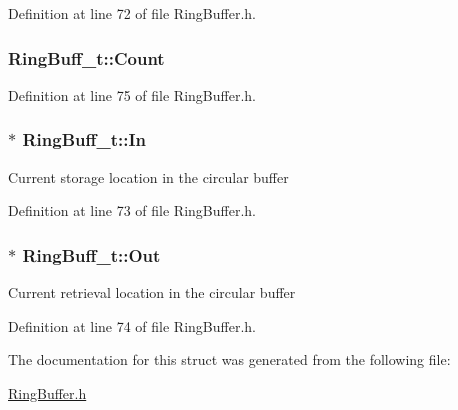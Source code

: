 \-Definition at line 72 of file \-Ring\-Buffer.\-h.

\hypertarget{struct_ring_buff__t_a41a9ebbce17afd63c9b1052b9374ab7f}{
\subsubsection[{\-Count}]{ {\bf \-Ring\-Buff\-\_\-t\-::\-Count}}}\label{struct_ring_buff__t_a41a9ebbce17afd63c9b1052b9374ab7f}


\-Definition at line 75 of file \-Ring\-Buffer.\-h.

\hypertarget{struct_ring_buff__t_ace48fed7a87967d5de48671dcd356ac6}{
\subsubsection[{\-In}]{$\ast$ {\bf \-Ring\-Buff\-\_\-t\-::\-In}}}\label{struct_ring_buff__t_ace48fed7a87967d5de48671dcd356ac6}
\-Current storage location in the circular buffer 

\-Definition at line 73 of file \-Ring\-Buffer.\-h.

\hypertarget{struct_ring_buff__t_adff6acf088e2c9697b9f19fb9ff91739}{
\subsubsection[{\-Out}]{$\ast$ {\bf \-Ring\-Buff\-\_\-t\-::\-Out}}}\label{struct_ring_buff__t_adff6acf088e2c9697b9f19fb9ff91739}
\-Current retrieval location in the circular buffer 

\-Definition at line 74 of file \-Ring\-Buffer.\-h.



\-The documentation for this struct was generated from the following file\-:\begin{DoxyCompactItemize}
\item 
\hyperlink{_ring_buffer_8h}{\-Ring\-Buffer.\-h}\end{DoxyCompactItemize}
